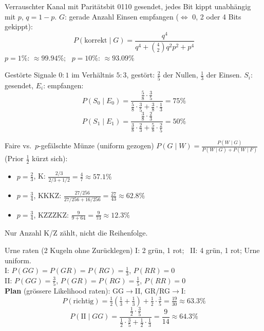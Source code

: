 \documentclass[a4paper, fontsize=7pt]{scrartcl}
\begin{document}
\begin{subbox}{Verrauschter Kanal mit Paritätsbit}
0110 gesendet, jedes Bit kippt unabhängig mit $p$, $q = 1-p$.
$G$: gerade Anzahl Einsen empfangen ($\Leftrightarrow$ 0, 2 oder 4 Bits
gekippt):
$$P(\text{korrekt} \mid G) = \frac{q^4}{q^4 + \binom{4}{2}q^2p^2 + p^4}$$
$p = 1\%$: $\approx 99.94\%$; \ $p = 10\%$: $\approx 93.09\%$
\end{subbox}

\begin{subbox}{Gestörte Signale}
$0 : 1$ im Verhältnis $5:3$, gestört: $\frac{2}{5}$ der Nullen,
$\frac{1}{3}$ der Einsen. $S_i$: gesendet, $E_i$: empfangen:
$$P(S_0 \mid E_0) = \frac{\frac{5}{8}\cdot\frac{3}{5}}
{\frac{5}{8}\cdot\frac{3}{5} + \frac{3}{8}\cdot\frac{1}{3}} = 75\%$$
$$P(S_1 \mid E_1) = \frac{\frac{3}{8}\cdot\frac{2}{3}}
{\frac{3}{8}\cdot\frac{2}{3} + \frac{5}{8}\cdot\frac{2}{5}} = 50\%$$
\end{subbox}

\begin{subbox}{Faire vs.\ $p$-gefälschte Münze (uniform gezogen)}
$P(G \mid W) = \frac{P(W \mid G)}{P(W \mid G) + P(W \mid F)}$
(Prior $\frac{1}{2}$ kürzt sich):
\begin{itemize}
    \item $p = \frac{2}{3}$, K: $\frac{2/3}{2/3 + 1/2} = \frac{4}{7}
          \approx 57.1\%$
    \item $p = \frac{3}{4}$, KKKZ: $\frac{27/256}{27/256 + 16/256} =
          \frac{27}{43} \approx 62.8\%$
    \item $p = \frac{3}{4}$, KZZZKZ: $\frac{9}{9 + 64} = \frac{9}{73}
          \approx 12.3\%$
\end{itemize}
Nur Anzahl K/Z zählt, nicht die Reihenfolge.
\end{subbox}

\begin{subbox}{Urne raten (2 Kugeln ohne Zurücklegen)}
I: 2 grün, 1 rot; \ II: 4 grün, 1 rot; Urne uniform.\\
I: $P(GG) = P(GR) = P(RG) = \frac{1}{3}$, $P(RR) = 0$\\
II: $P(GG) = \frac{3}{5}$, $P(GR) = P(RG) = \frac{1}{5}$, $P(RR) = 0$\\
\textbf{Plan} (grössere Likelihood raten): GG$\to$II, GR/RG$\to$I:
$$P(\text{richtig}) = \tfrac{1}{2}\left(\tfrac{1}{3} + \tfrac{1}{3}\right)
+ \tfrac{1}{2} \cdot \tfrac{3}{5} = \tfrac{19}{30} \approx 63.3\%$$
$$P(\text{II} \mid GG) = \frac{\frac{1}{2}\cdot\frac{3}{5}}
{\frac{1}{2}\cdot\frac{3}{5} + \frac{1}{2}\cdot\frac{1}{3}} = \frac{9}{14}
\approx 64.3\%$$
\end{subbox}
\end{document}
